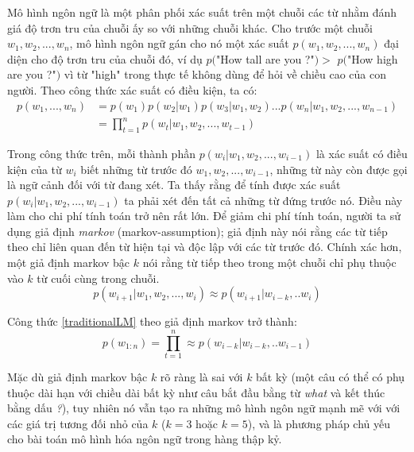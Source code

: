 Mô hình ngôn ngữ là một phân phối xác suất trên một chuỗi các từ nhằm đánh giá độ trơn tru của chuỗi ấy so với những chuỗi khác. Cho trước một chuỗi $w_1,w_2,...,w_n$, mô hình ngôn ngữ gán cho nó một xác suất $p(w_1,w_2,...,w_n)$ đại diện cho độ trơn tru của chuỗi đó, ví dụ $p($"How tall are you ?"$) >$ $p($"How high are you ?"$)$ vì từ "high" trong thực tế không dùng để hỏi về chiều cao của con người. Theo công thức xác suất có điều kiện, ta có:
\begin{equation} \label{traditionalLM}
\begin{split}
	p(w_1,...,w_n) &= p(w_1)p(w_2|w_1)p(w_3|w_1,w_2)...p(w_n|w_1,w_2,...,w_{n-1}) \\
				&= \prod_{t=1}^{n} p(w_t|w_1,w_2,...,w_{t-1})
\end{split}
\end{equation}
 
Trong công thức trên, mỗi thành phần $p(w_i|w_1,w_2,...,w_{i-1})$ là xác suất có điều kiện của từ $w_i$ biết những từ trước đó $w_1,w_2,...,w_{i-1}$, những từ này còn được gọi là ngữ cảnh đối với từ đang xét. Ta thấy rằng để tính được xác suất $p(w_i|w_1,w_2,...,w_{i-1})$ ta phải xét đến tất cả những từ đứng trước nó. Điều này làm cho chi phí tính toán trở nên rất lớn. Để giảm chi phí tính toán, người ta sử dụng giả định \textit{markov} (markov-assumption); giả định này nói rằng các từ tiếp theo chỉ liên quan đến từ hiện tại và độc lập với các từ trước đó. Chính xác hơn, một giả định markov bậc $k$ nói rằng từ tiếp theo trong một chuỗi chỉ phụ thuộc vào $k$ từ cuối cùng trong chuỗi.
\begin{equation} \label{markovAssumption}
	p(w_{i+1}|w_1,w_2,...,w_{i}) \approx p(w_{i+1}|w_{i-k},..w_{i})
\end{equation}

Công thức \ref{traditionalLM} theo giả định markov trở thành:
\begin{equation} \label{traditionalLM2}
	p(w_{1:n}) = \prod_{t=1}^{n} \approx p(w_{i-k}|w_{i-k},..w_{i-1})
\end{equation}

Mặc dù giả định markov bậc $k$ rõ ràng là sai với $k$ bất kỳ (một câu có thể có phụ thuộc dài hạn với chiều dài bất kỳ như câu bắt đầu bằng từ \textit{what} và kết thúc bằng dấu \textit{?}), tuy nhiên nó vẫn tạo ra những mô hình ngôn ngữ mạnh mẽ với với các giá trị tương đối nhỏ của $k$ ($k=3$ hoặc $k=5$), và là phương pháp chủ yếu cho bài toán mô hình hóa ngôn ngữ trong hàng thập kỷ.

